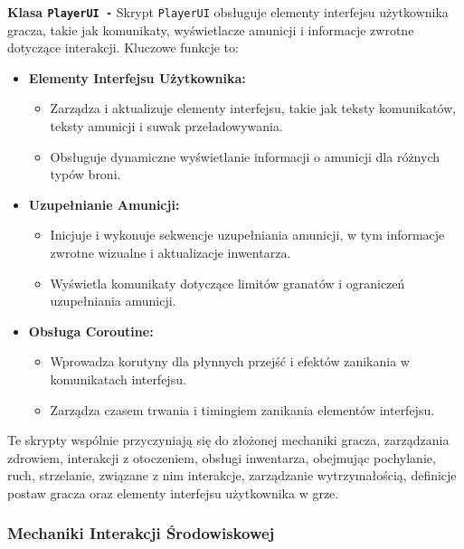 \textbf{Klasa \texttt{PlayerUI -}}
Skrypt \texttt{PlayerUI} obsługuje elementy interfejsu użytkownika gracza, takie jak komunikaty, wyświetlacze amunicji i informacje zwrotne dotyczące interakcji. Kluczowe funkcje to:
\begin{itemize}
  \item \textbf{Elementy Interfejsu Użytkownika:}
    \begin{itemize}
      \item Zarządza i aktualizuje elementy interfejsu, takie jak teksty komunikatów, teksty amunicji i suwak przeładowywania.
      \item Obsługuje dynamiczne wyświetlanie informacji o amunicji dla różnych typów broni.
    \end{itemize}
  \item \textbf{Uzupełnianie Amunicji:}
    \begin{itemize}
      \item Inicjuje i wykonuje sekwencje uzupełniania amunicji, w tym informacje zwrotne wizualne i aktualizacje inwentarza.
      \item Wyświetla komunikaty dotyczące limitów granatów i ograniczeń uzupełniania amunicji.
    \end{itemize}
  \item \textbf{Obsługa Coroutine:}
    \begin{itemize}
      \item Wprowadza korutyny dla płynnych przejść i efektów zanikania w komunikatach interfejsu.
      \item Zarządza czasem trwania i timingiem zanikania elementów interfejsu.
    \end{itemize}
\end{itemize}

Te skrypty wspólnie przyczyniają się do złożonej mechaniki gracza, zarządzania zdrowiem, interakcji z otoczeniem, obsługi inwentarza, obejmując pochylanie, ruch, strzelanie, związane z nim interakcje, zarządzanie wytrzymałością, definicje postaw gracza oraz elementy interfejsu użytkownika w grze.

\subsubsection{Mechaniki Interakcji Środowiskowej}

